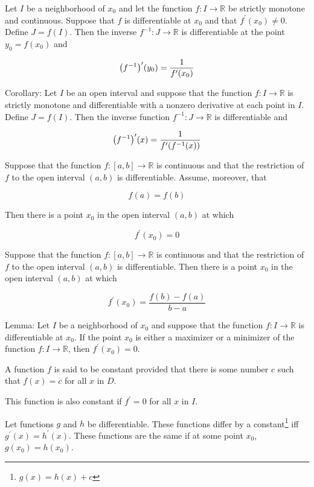 \begin{thm}
    Let $I$ be a neighborhood of $x_0$ and let the function $f:I\to\mathbb{R}$ be strictly monotone and continuous.
    Suppose that $f$ is differentiable at $x_0$ and that $f^\prime(x_0) \neq 0$. Define $J = f(I)$. Then the inverse
    $f^{-1}:J\to\mathbb{R}$ is differentiable at the point $y_0 = f(x_0)$ and

    \[
        {\left( f^{-1} \right)}^\prime (y_0) = \frac{1}{f^\prime(x_0)}
    \]

    Corollary: Let $I$ be an open interval and suppose that the function $f:I\to\mathbb{R}$ is strictly monotone and
    differentiable with a nonzero derivative at each point in $I$. Define $J = f(I)$. Then the inverse function
    $f^{-1}:J\to\mathbb{R}$ is differentiable and

    \[
        {\left( f^{-1} \right)}^\prime(x) = \frac{1}{f^\prime{\left( f^{-1}(x) \right)}}
    \]
\end{thm}

\begin{thm}
    Suppose that the function $f:[a, b]\to\mathbb{R}$ is continuous and that the restriction of $f$ to the open interval
    $(a, b)$ is differentiable. Assume, moreover, that

    \[ f(a) = f(b) \]

    Then there is a point $x_0$ in the open interval $(a, b)$ at which

    \[ f^\prime(x_0) = 0 \]
\end{thm}

\begin{thm}
    Suppose that the function $f:[a, b]\to\mathbb{R}$ is continuous and that the restriction of $f$ to the open interval
    $(a, b)$ is differentiable. Then there is a point $x_0$ in the open interval $(a, b)$ at which

    \[ f^\prime(x_0) = \frac{f(b) - f(a)}{b-a} \]

    Lemma: Let $I$ be a neighborhood of $x_0$ and suppose that the function $f:I\to\mathbb{R}$ is differentiable at
    $x_0$. If the point $x_0$ is either a maximizer or a minimizer of the function $f:I\to\mathbb{R}$, then
    $f^\prime(x_0) = 0$.
\end{thm}

\begin{thm}
    A function $f$ is said to be constant provided that there is some number $c$ such that $f(x) = c$ for all $x$ in
    $D$.

    This function is also constant if $f^\prime = 0$ for all $x$ in $I$.

    Let functions $g$ and $h$ be differentiable. These functions differ by a constant\footnote{$g(x) = h(x) + c$} iff
    $g^\prime(x) = h^\prime(x)$. These functions are the same if at some point $x_0$, $g(x_0) = h(x_0)$.
\end{thm}

